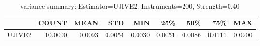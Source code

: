 \begin{table}[ht]
\centering
\caption{variance summary: Estimator=UJIVE2, Instruments=200, Strength=0.40}
\begin{tabular}{lrrrrrrrr}
\toprule
 & COUNT & MEAN & STD & MIN & 25\% & 50\% & 75\% & MAX \\
\midrule
UJIVE2 & 10.0000 & 0.0093 & 0.0054 & 0.0030 & 0.0051 & 0.0086 & 0.0111 & 0.0200 \\
\bottomrule
\end{tabular}
\end{table}

